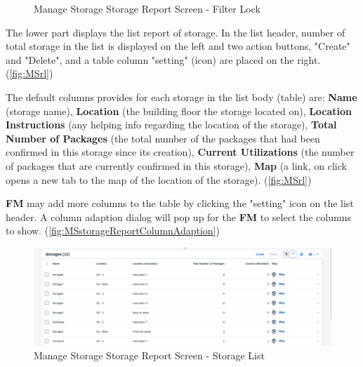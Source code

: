 \begin{figure}[H]
	\centering
    \vspace{5pt}
    \hspace{5pt}
    \caption{Manage Storage Storage Report Screen - Filter Lock}
	\label{fig:MSstorageReportFilterLock}
\end{figure}

\bigskip

The lower part displays the list report of storage. In the list header, number of total storage in the list is displayed on the left and two action buttons, "Create" and "Delete", and a table column "setting" (icon) are placed on the right. (\autoref{fig:MSrl})

The default columns provides for each storage in the list body (table) are: \textbf{Name} (storage name), \textbf{Location} (the building floor the storage located on), \textbf{Location Instructions} (any helping info regarding the location of the storage), \textbf{Total Number of Packages} (the total number of the packages that had been confirmed in this storage since its creation), \textbf{Current Utilizations} (the number of packages that are currently confirmed in this storage), \textbf{Map} (a link, on click opens a new tab to the map of the location of the storage). 
(\autoref{fig:MSrl})

\textbf{FM} may add more columns to the table by clicking the "setting" icon on the list header. A column adaption dialog will pop up for the \textbf{FM} to select the columns to show.
(\autoref{fig:MSstorageReportColumnAdaption})

\begin{figure}[H] %
	\centering
	\includegraphics[width=1\linewidth]{images/user_doc/storage/StorageReportPage/reportList.png}
	\caption{Manage Storage Storage Report Screen - Storage List}
	\label{fig:MSrl}
\end{figure}

